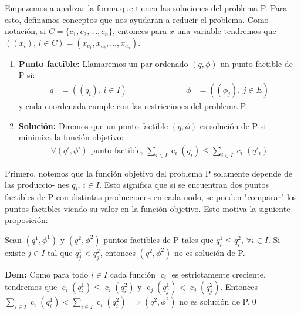 \documentclass[12pt,twoside]{article}
\newenvironment{proposicion}[2][\(\blacksquare\) Proposici\'on]{\begin{trivlist}
		\item[\hskip \labelsep {\bfseries #1}\hskip \labelsep {\bfseries #2.}]}{\end{trivlist}}
\begin{document}
	\hspace{1cm}Empezemos a analizar la forma que tienen las soluciones del problema P. Para esto, definamos conceptos que nos ayudaran a reducir el problema. Como notaci\'on, si \(C=\{c_1,c_2,\dots,c_n\}\), entonces para \(x\) una variable tendremos que \(((x_i),\,i\in C)=(x_{c_1},x_{c_2},\dots,x_{c_n})\).
	
	\begin{enumerate}
		\item [(i)] \textbf{Punto factible:} Llamaremos un par ordenado \((q,\phi)\) un punto factible de P si:
		\begin{equation*}
			\begin{aligned}
				q&=((q_i),\,i \in I)&&\hspace{2cm}&\phi&=((\phi_{j}),\,j\in E)
			\end{aligned}
		\end{equation*}
		y cada coordenada cumple con las restricciones del problema P.
		\item [(ii)] \textbf{Soluci\'on:} Diremos que un punto factible \((q,\phi)\) es soluci\'on de P si minimiza la funci\'on objetivo:
		\begin{equation*}
			\begin{aligned}
				\forall (q',\phi') \text{ punto factible, }\sum_{i\in I}\operatorname{c}_i(q_i)\leq\sum_{i\in I}\operatorname{c}_i(q'_i)
			\end{aligned}
		\end{equation*}
	\end{enumerate}
	
	\hspace{1cm} Primero, notemos que la funci\'on objetivo del problema P solamente depende de las produccio- nes \(q_i,\, i\in I\). Esto significa que si se encuentran dos puntos factibles de P con distintas producciones en cada nodo, se pueden "comparar" los puntos factibles viendo su valor en la funci\'on objetivo. Esto motiva la siguiente proposici\'on:
	
	\vspace{0.4cm}
	\begin{proposicion}{1} Sean \((q^1,\phi^1)\) y \((q^2,\phi^2)\) puntos factibles de P tales que \(q^1_i\leq q^2_i,\, \forall i \in I\). Si existe \(j \in I\) tal que \(q^1_j< q^2_j\), entonces \((q^2,\phi^2)\) no es soluci\'on de P.
		
		\textbf{Dem:} Como para todo \(i \in I\) cada funci\'on \(\operatorname{c}_i\) es estrictamente creciente, tendremos que \(\operatorname{c}_i(q^1_i)\leq\operatorname{c}_i(q^2_i)\) y \(\operatorname{c}_j(q^1_j)<\operatorname{c}_j(q^2_j)\). Entonces \(\sum_{i\in I}\operatorname{c}_i(q^1_i)<\sum_{i\in I}\operatorname{c}_i(q^2_i)\implies(q^2,\phi^2)\) no es soluci\'on de P.\qed
	\end{proposicion}
	
\end{document}
